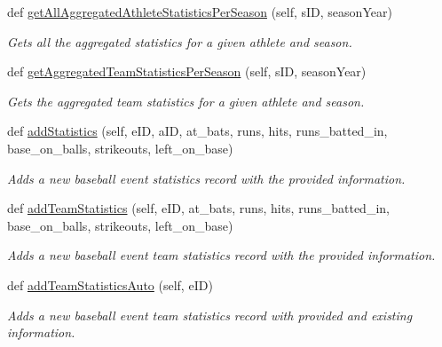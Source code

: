 \begin{DoxyCompactItemize}
def \hyperlink{classhandler_1_1dao_1_1baseball__event__dao_1_1_baseball_event_d_a_o_a644f82471bb5275d1356924a0f53b568}{get\+All\+Aggregated\+Athlete\+Statistics\+Per\+Season} (self, s\+ID, season\+Year)
\begin{DoxyCompactList}\small\item\em Gets all the aggregated statistics for a given athlete and season. \end{DoxyCompactList}\item 
def \hyperlink{classhandler_1_1dao_1_1baseball__event__dao_1_1_baseball_event_d_a_o_aa157f9e261a9f259673833c0cf35a012}{get\+Aggregated\+Team\+Statistics\+Per\+Season} (self, s\+ID, season\+Year)
\begin{DoxyCompactList}\small\item\em Gets the aggregated team statistics for a given athlete and season. \end{DoxyCompactList}\item 
def \hyperlink{classhandler_1_1dao_1_1baseball__event__dao_1_1_baseball_event_d_a_o_a4285145a0c3ed5effd7f2a45e8f72e93}{add\+Statistics} (self, e\+ID, a\+ID, at\+\_\+bats, runs, hits, runs\+\_\+batted\+\_\+in, base\+\_\+on\+\_\+balls, strikeouts, left\+\_\+on\+\_\+base)
\begin{DoxyCompactList}\small\item\em Adds a new baseball event statistics record with the provided information. \end{DoxyCompactList}\item 
def \hyperlink{classhandler_1_1dao_1_1baseball__event__dao_1_1_baseball_event_d_a_o_afa6c431f7bd18a5be5a399c7a7feb868}{add\+Team\+Statistics} (self, e\+ID, at\+\_\+bats, runs, hits, runs\+\_\+batted\+\_\+in, base\+\_\+on\+\_\+balls, strikeouts, left\+\_\+on\+\_\+base)
\begin{DoxyCompactList}\small\item\em Adds a new baseball event team statistics record with the provided information. \end{DoxyCompactList}\item 
def \hyperlink{classhandler_1_1dao_1_1baseball__event__dao_1_1_baseball_event_d_a_o_a31bb64535cabe71a0a9f7b8223e8d95a}{add\+Team\+Statistics\+Auto} (self, e\+ID)
\begin{DoxyCompactList}\small\item\em Adds a new baseball event team statistics record with provided and existing information. \end{DoxyCompactList}\item 

\end{DoxyCompactItemize}
